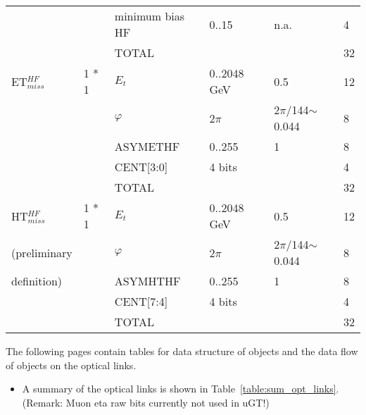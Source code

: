 \documentclass{cmspaper}
\begin{document}
\begin{table}[ht]
\begin{tabular}{| l | l | l | l | l | l |}
    &       &   minimum bias HF &      0..15    &   n.a.    &   4                    \\
    &       &   TOTAL   &       &       &   32                    \\
\hline
ET$_{miss}^{HF}$	&	1 * 1	&   $E_t$   &   0..2048 GeV &   0.5 &   12                    \\
	&		&   $\varphi$   &   2$\pi$  &   2$\pi$/144$\sim$0.044   &   8                    \\
    &       &   ASYMETHF    &  0..255     &    1   &   8                    \\
    &       &   CENT[3:0]    &  4 bits    &       &   4                    \\
	&		&	TOTAL	&		&		&	32                    \\
\hline
HT$_{miss}^{HF}$	&	1 * 1	&   $E_t$   &   0..2048 GeV &   0.5 &   12                    \\
(preliminary	&		&   $\varphi$   &   2$\pi$  &   2$\pi$/144$\sim$0.044   &   8                    \\
definition)	&		&	ASYMHTHF	&	0..255 &	1 &	8                    \\
    &       &   CENT[7:4]    & 4 bits     &       &   4                    \\
	&		&	TOTAL	&		&		&	32                    \\
\hline
\end{tabular}
\label{table:scales_table_2}
\end{table}

\clearpage

The following pages contain tables for data structure of objects and the data flow of objects on the optical links.

\begin{itemize}
\item A summary of the optical links is shown in Table~\ref{table:sum_opt_links}. (Remark: Muon eta raw bits currently not used in uGT!)
\end{itemize}
\end{document}
